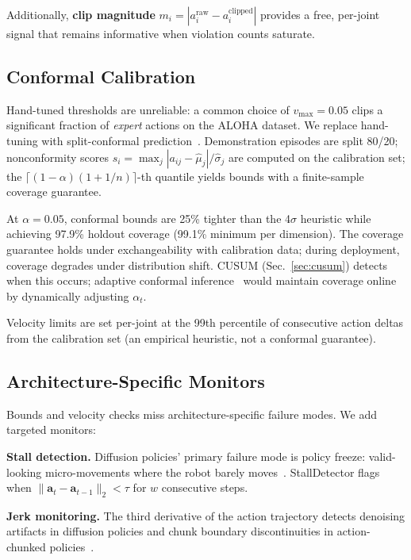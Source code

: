 \documentclass[conference]{IEEEtran}
\begin{document}
Additionally, \textbf{clip magnitude} $m_i = |a_i^{\text{raw}} - a_i^{\text{clipped}}|$ provides a free, per-joint signal that remains informative when violation counts saturate.

\subsection{Conformal Calibration}
\label{sec:calibration}

Hand-tuned thresholds are unreliable: a common choice of $v_{\max}{=}0.05$ clips a significant fraction of \emph{expert} actions on the ALOHA dataset.
We replace hand-tuning with split-conformal prediction~\cite{vovk2005}.
Demonstration episodes are split 80/20; nonconformity scores $s_i = \max_j |a_{ij} - \hat{\mu}_j| / \hat{\sigma}_j$ are computed on the calibration set; the $\lceil(1{-}\alpha)(1 + 1/n)\rceil$-th quantile yields bounds with a finite-sample coverage guarantee.

At $\alpha{=}0.05$, conformal bounds are 25\% tighter than the 4$\sigma$ heuristic while achieving 97.9\% holdout coverage (99.1\% minimum per dimension).
The coverage guarantee holds under exchangeability with calibration data; during deployment, coverage degrades under distribution shift.
CUSUM (Sec.~\ref{sec:cusum}) detects when this occurs; adaptive conformal inference~\cite{gibbs2021} would maintain coverage online by dynamically adjusting $\alpha_t$.

Velocity limits are set per-joint at the 99th percentile of consecutive action deltas from the calibration set (an empirical heuristic, not a conformal guarantee).

\subsection{Architecture-Specific Monitors}
\label{sec:health}

Bounds and velocity checks miss architecture-specific failure modes.
We add targeted monitors:

\noindent\textbf{Stall detection.}
Diffusion policies' primary failure mode is policy freeze: valid-looking micro-movements where the robot barely moves~\cite{safe2025}.
StallDetector flags when $\|\mathbf{a}_t - \mathbf{a}_{t-1}\|_2 < \tau$ for $w$ consecutive steps.

\noindent\textbf{Jerk monitoring.}
The third derivative of the action trajectory detects denoising artifacts in diffusion policies and chunk boundary discontinuities in action-chunked policies~\cite{acg2025}.
\end{document}
